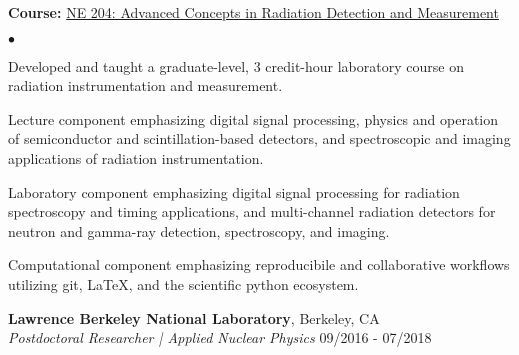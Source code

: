 \documentclass[margin,line]{res}
\newenvironment{list1}{
  \begin{list}{\ding{113}}{%
      \setlength{\itemsep}{0in}
      \setlength{\parsep}{0in} \setlength{\parskip}{0in}
      \setlength{\topsep}{0in} \setlength{\partopsep}{0in} 
      \setlength{\leftmargin}{0.17in}}}{\end{list}}
\newenvironment{list2}{
  \begin{list}{$\bullet$}{%
      \setlength{\itemsep}{0in}
      \setlength{\parsep}{0in} \setlength{\parskip}{0in}
      \setlength{\topsep}{0in} \setlength{\partopsep}{0in} 
      \setlength{\leftmargin}{0.2in}}}{\end{list}}
\begin{document}
\begin{resume}
\begin{list1}
  \item[] {\bf \small Course:} \href{https://ne204-fall2018.github.io}{NE 204: Advanced Concepts in Radiation
Detection and Measurement}
  \begin{list2}
    \item Developed and taught a graduate-level, 3 credit-hour laboratory
          course on radiation instrumentation and measurement.
    \item Lecture component emphasizing digital signal processing, physics and
          operation of semiconductor and scintillation-based detectors, and
          spectroscopic and imaging applications of radiation instrumentation.
    \item Laboratory component emphasizing digital signal processing for
          radiation spectroscopy and timing applications, and multi-channel
          radiation detectors for neutron and gamma-ray detection, spectroscopy,
          and imaging.
    \item Computational component emphasizing reproducibile and collaborative
          workflows utilizing git, \LaTeX, and the scientific python ecosystem. 
  \end{list2}
\end{list1}

{\bf Lawrence Berkeley National Laboratory}, Berkeley, CA \\
{\em Postdoctoral Researcher | Applied Nuclear Physics} \hfill 09/2016 - 07/2018


\end{resume}
\end{document}
